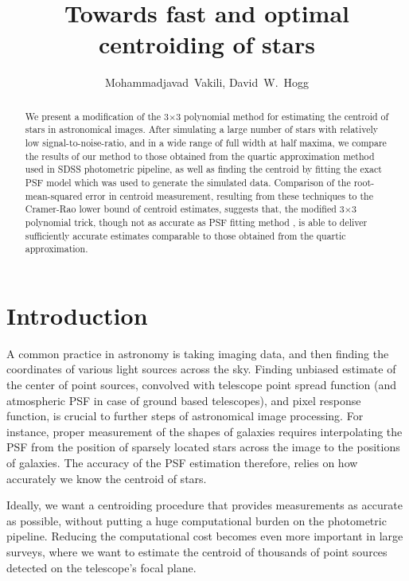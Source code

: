 \documentclass[12pt, preprint]{aastex}
\begin{document}
\author{
  Mohammadjavad~Vakili,
  David~W.~Hogg
}

\title{Towards fast and optimal centroiding of stars}

\begin{abstract}

We present a modification of the 3$\times$3 polynomial method for estimating the centroid 
of stars in astronomical images. After simulating a large number of stars with relatively low 
signal-to-noise-ratio, and in a wide range of full width at half maxima, we compare the results of our method
to those obtained from the quartic approximation method used in SDSS photometric pipeline, 
as well as finding the centroid by fitting the exact PSF model which was used to generate the 
simulated data. Comparison of the root-mean-squared error in centroid measurement, resulting 
from these techniques to the Cramer-Rao lower bound of centroid estimates, 
suggests that, the modified 3$\times$3 polynomial trick, though not as accurate as PSF fitting method
, is able to deliver sufficiently accurate estimates comparable to those obtained from the quartic approximation.

\end{abstract}

\section{Introduction}

A common practice in astronomy is taking imaging data, and then finding the coordinates
of various light sources across the sky. Finding unbiased estimate of the center of point
sources, convolved with telescope point spread function (and atmospheric PSF in case of
ground based telescopes), and pixel response function, is crucial to further steps of
astronomical image processing. For instance, proper measurement of the shapes of galaxies
requires interpolating the PSF from the position of sparsely located stars across the
image to the positions of galaxies. The accuracy of the PSF estimation therefore,
relies on how accurately we know the centroid of stars. 

Ideally, we want a centroiding procedure that provides measurements as accurate as possible,
without putting a huge computational burden on the photometric pipeline.
Reducing the computational cost becomes even more important in large surveys,
where we want to estimate the centroid of thousands of point sources detected
on the telescope's focal plane. 
\end{document}
